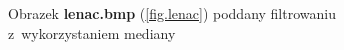 \documentclass{classrep}
\begin{document}
\begin{figure}
{{  \label{fig.lenac_median_5x5}
 }
}
\caption{Obrazek \textbf{lenac.bmp} (\ref{fig.lenac}) poddany filtrowaniu z~wykorzystaniem mediany}
\label{fig.lenac_median}
\end{figure}
\end{document}
